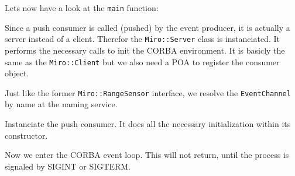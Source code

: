 
\label{lst:SonarNotify2}

Lets now have a look at the \lstinline!main! function:



Since a push consumer is called (pushed) by the event producer, it is
actually a server instead of a client. Therefor the
\lstinline!Miro::Server!  class is instanciated. It performs the
necessary calls to init the CORBA environment. It is basicly the same
as the \lstinline!Miro::Client!  but we also need a POA to register
the consumer object.



Just like the former \lstinline!Miro::RangeSensor! interface, we
resolve the \lstinline!EventChannel! by name at the naming service.



Instanciate the push consumer. It does all the necessary
initialization within its constructor.



Now we enter the CORBA event loop. This will not return, until the
process is signaled by SIGINT or SIGTERM.

